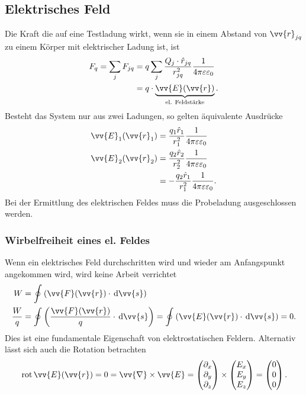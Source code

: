\subsection{Elektrisches Feld}
Die Kraft die auf eine Testladung wirkt, wenn sie in einem Abstand von $\vv{r}_{jq}$ zu einem Körper mit elektrischer Ladung ist, ist
\begin{align*}
        F_q=\sum_{j}^{}F_{jq}&=q\sum_{j}^{}\dfrac{Q_j\cdot \hat{r}_{jq}}{r_{jq}^2}\dfrac{1}{4\pi \varepsilon \varepsilon _0}\\
                             &=q\cdot \underbrace{\vv{E}(\vv{r})}_{\,\text{el. Feldstärke}\,}
.\end{align*}
Besteht das System nur aus zwei Ladungen, so gelten äquivalente Ausdrücke
\begin{align*}
        \vv{E}_1(\vv{r}_1)&=\dfrac{q_1\hat{r}_1}{r_1^2}\dfrac{1}{4\pi \varepsilon \varepsilon _0}\\
        \vv{E}_2(\vv{r}_2)&=\dfrac{q_2\hat{r}_2}{r_2^2}\dfrac{1}{4\pi \varepsilon \varepsilon _0}\\
                          &=-\dfrac{q_2\hat{r}_1}{r_1^2}\dfrac{1}{4\pi \varepsilon \varepsilon _0}
.\end{align*}
Bei der Ermittlung des elektrischen Feldes muss die Probeladung ausgeschlossen werden.

\subsubsection{Wirbelfreiheit eines el. Feldes}
Wenn ein elektrisches Feld durchschritten wird und wieder am Anfangspunkt angekommen wird, wird keine Arbeit verrichtet
\begin{align*}
        W&=\oint_{}^{}\left(\vv{F}(\vv{r})\cdot \td \vv{s}\right)\\
        \dfrac{W}{q}&=\oint_{}^{}\left(\dfrac{\vv{F}(\vv{r})}{q}\cdot \td \vv{s}\right)=\oint_{}^{}\left(\vv{E}(\vv{r})\cdot \td \vv{s}\right)=0
.\end{align*}
Dies ist eine fundamentale Eigenschaft von elektrostatischen Feldern. Alternativ lässt sich auch die Rotation betrachten
\begin{align*}
        \,\text{rot}\,\vv{E}(\vv{r})=0=\vv{\nabla }\times \vv{E}=\begin{pmatrix}
                                            \partial_x\\\partial_y\\\partial_z
                                    \end{pmatrix}\times \begin{pmatrix}
                                            E_x\\E_y\\E_z
                                    \end{pmatrix}=\begin{pmatrix}
                                            0\\0\\0
                                    \end{pmatrix}
.\end{align*}

